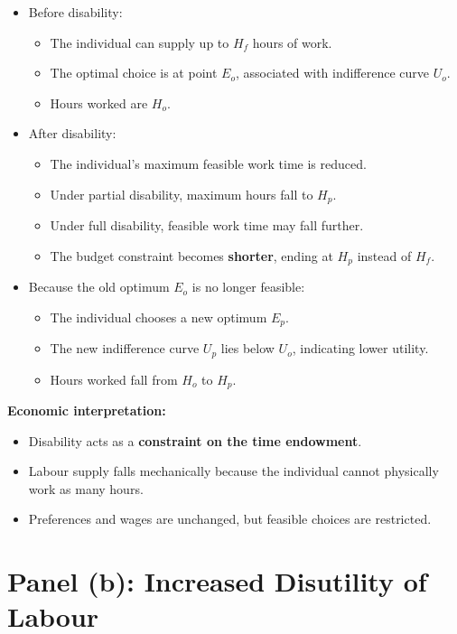 \documentclass[12pt]{article}
\begin{document}
\begin{itemize}
\item Before disability:
  \begin{itemize}
  \item The individual can supply up to $H_f$ hours of work.
  \item The optimal choice is at point $E_o$, associated with indifference curve $U_o$.
  \item Hours worked are $H_o$.
  \end{itemize}

\item After disability:
  \begin{itemize}
  \item The individual’s maximum feasible work time is reduced.
  \item Under partial disability, maximum hours fall to $H_p$.
  \item Under full disability, feasible work time may fall further.
  \item The budget constraint becomes \textbf{shorter}, ending at $H_p$ instead of $H_f$.
  \end{itemize}

\item Because the old optimum $E_o$ is no longer feasible:
  \begin{itemize}
  \item The individual chooses a new optimum $E_p$.
  \item The new indifference curve $U_p$ lies below $U_o$, indicating lower utility.
  \item Hours worked fall from $H_o$ to $H_p$.
  \end{itemize}
\end{itemize}

\textbf{Economic interpretation:}
\begin{itemize}
\item Disability acts as a \textbf{constraint on the time endowment}.
\item Labour supply falls mechanically because the individual cannot physically work as many hours.
\item Preferences and wages are unchanged, but feasible choices are restricted.
\end{itemize}

\vspace{0.5em}

\section*{Panel (b): Increased Disutility of Labour}
\end{document}
